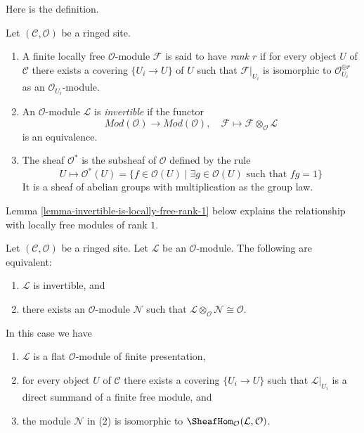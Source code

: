 \noindent
Here is the definition.

\begin{definition}
\label{definition-invertible-sheaf}
Let $(\mathcal{C}, \mathcal{O})$ be a ringed site.
\begin{enumerate}
\item A finite locally free $\mathcal{O}$-module $\mathcal{F}$ is said
to have {\it rank $r$} if for every object $U$ of $\mathcal{C}$ there
exists a covering $\{U_i \to U\}$ of $U$ such that $\mathcal{F}|_{U_i}$
is isomorphic to $\mathcal{O}_{U_i}^{\oplus r}$ as an
$\mathcal{O}_{U_i}$-module.
\item An $\mathcal{O}$-module $\mathcal{L}$ is {\it invertible}
if the functor
$$
\textit{Mod}(\mathcal{O}) \longrightarrow \textit{Mod}(\mathcal{O}),\quad
\mathcal{F}  \longmapsto \mathcal{F} \otimes_\mathcal{O} \mathcal{L}
$$
is an equivalence.
\item The sheaf {\it $\mathcal{O}^*$} is the subsheaf of
$\mathcal{O}$ defined by the rule
$$
U \longmapsto \mathcal{O}^*(U) = \{f \in \mathcal{O}(U) \mid
\exists g \in \mathcal{O}(U)\text{ such that }fg = 1\}
$$
It is a sheaf of abelian groups with multiplication as the group law.
\end{enumerate}
\end{definition}

\noindent
Lemma \ref{lemma-invertible-is-locally-free-rank-1}
below explains the relationship with locally free modules
of rank $1$.

\begin{lemma}
\label{lemma-invertible}
Let $(\mathcal{C}, \mathcal{O})$ be a ringed site. Let $\mathcal{L}$
be an $\mathcal{O}$-module. The following are equivalent:
\begin{enumerate}
\item $\mathcal{L}$ is invertible, and
\item there exists an $\mathcal{O}$-module $\mathcal{N}$
such that
$\mathcal{L} \otimes_\mathcal{O} \mathcal{N} \cong \mathcal{O}$.
\end{enumerate}
In this case we have
\begin{enumerate}
\item[(a)] $\mathcal{L}$ is a flat $\mathcal{O}$-module of finite presentation,
\item[(b)] for every object $U$ of $\mathcal{C}$ there exists a
covering $\{U_i \to U\}$ such that $\mathcal{L}|_{U_i}$
is a direct summand of a finite free module, and
\item[(c)] the module $\mathcal{N}$ in (2) is isomorphic to
$\SheafHom_\mathcal{O}(\mathcal{L}, \mathcal{O})$.
\end{enumerate}
\end{lemma}

